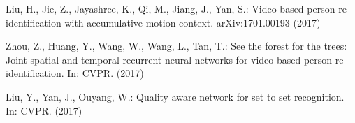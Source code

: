 \documentclass{llncs}
\begin{document}
\begin{thebibliography}{10}
Liu, H., Jie, Z., Jayashree, K., Qi, M., Jiang, J., Yan, S.:
\newblock Video-based person re-identification with accumulative motion
  context.
\newblock arXiv:1701.00193 (2017)

Zhou, Z., Huang, Y., Wang, W., Wang, L., Tan, T.:
\newblock See the forest for the trees: Joint spatial and temporal recurrent
  neural networks for video-based person re-identification.
\newblock In: CVPR. (2017)

Liu, Y., Yan, J., Ouyang, W.:
\newblock Quality aware network for set to set recognition.
\newblock In: CVPR. (2017)

\end{thebibliography}
\end{document}
